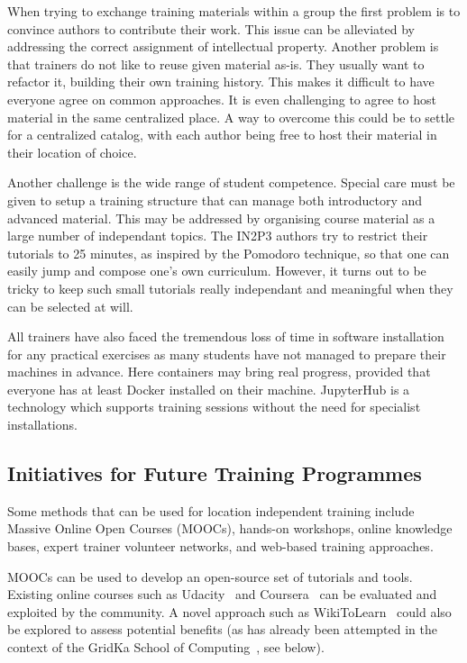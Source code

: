 \documentclass[12pt,a4paper]{article}
\begin{document}
When trying to exchange training materials within a group the first problem is
to convince authors to contribute their work. This issue
can be alleviated by addressing the correct assignment of intellectual property.
Another problem is that trainers do not like to reuse given material as-is. They usually
want to refactor it, building their own training history.
This makes it difficult to have everyone agree on common approaches.
It is even challenging to agree to host material in the same
centralized place. A way to overcome this could be to settle for a centralized
catalog, with each author being free to host their material in their location
of choice.

Another challenge is the wide range of student competence. Special care must be
given to setup a training structure that can manage both introductory and
advanced material. This may be addressed by organising course material as a
large number of independant topics. The IN2P3 authors try to restrict their
tutorials to 25 minutes, as inspired by the Pomodoro
technique\cite{PomodoroTechnique}, so that one can easily jump and compose one's
own curriculum. However, it turns out to be tricky to keep such small tutorials
really independant and meaningful when they can be selected at will.

All trainers have also faced the tremendous loss of time
in software installation for any practical exercises as many students have
not managed to prepare their machines in advance.
Here containers may bring real
progress, provided that everyone has at least Docker\cite{Docker} installed on
their machine.
JupyterHub\cite{JupyterHub} is a technology which supports training sessions
without the need for specialist installations.

\subsection{Initiatives for Future Training Programmes\label{sec:initiatives}} 

Some methods that can be used for location independent training include Massive
Online Open Courses (MOOCs), hands-on workshops, online knowledge bases, expert trainer volunteer
networks, and web-based training approaches.

MOOCs can be used to develop an open-source set of
tutorials and tools. Existing online courses such as Udacity~\cite{Udacity} and 
Coursera~\cite{Coursera} can be
evaluated and exploited by the community. A novel approach such as
WikiToLearn~\cite{WikiToLearn} could also be explored to assess potential benefits (as has already been attempted
in the context of the GridKa School of Computing~\cite{GridKa}, see below).
\end{document}
